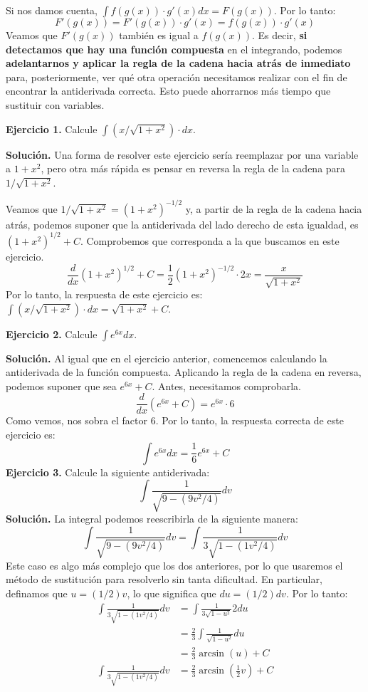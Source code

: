 \documentclass[12pt]{article}
\begin{document}
Si nos damos cuenta, $\int f(g(x)) \cdot g'(x) dx = F(g(x))$. Por lo tanto:
\[
  F'(g(x)) = F'(g(x)) \cdot g'(x) = f(g(x)) \cdot g'(x)
\]
Veamos que $F'(g(x))$ también es igual a $f(g(x))$. Es decir, \textbf{si detectamos que hay una función compuesta} en el integrando, podemos \textbf{adelantarnos y aplicar la regla de la cadena hacia atrás de inmediato} para, posteriormente, ver qué otra operación necesitamos realizar con el fin de encontrar la antiderivada correcta. Esto puede ahorrarnos más tiempo que sustituir con variables.

\textbf{Ejercicio 1.} \quad Calcule $\int (x/\sqrt{1 + x^{2}}) \cdot dx$.

\textbf{Solución.} \quad Una forma de resolver este ejercicio sería reemplazar por una variable a $1 + x^{2}$, pero otra más rápida es pensar en reversa la regla de la cadena para $1/\sqrt{1 + x^{2}}$.

Veamos que $1/\sqrt{1 + x^{2}} = (1 + x^{2})^{-1/2}$ y, a partir de la regla de la cadena hacia atrás, podemos suponer que la antiderivada del lado derecho de esta igualdad, es $(1 + x^{2})^{1/2} + C$. Comprobemos que corresponda a la que buscamos en este ejercicio.
\[
  \frac{d}{dx} (1 + x^{2})^{1/2} + C = \frac{1}{2} (1 + x^{2})^{-1/2} \cdot 2x = \frac{x}{\sqrt{1 + x^{2}}}
\]
Por lo tanto, la respuesta de este ejercicio es: $\int (x/\sqrt{1 + x^{2}}) \cdot dx = \sqrt{1 + x^{2}} + C$.

\textbf{Ejercicio 2.} \quad Calcule $\int e^{6x} dx$.

\textbf{Solución.} \quad Al igual que en el ejercicio anterior, comencemos calculando la antiderivada de la función compuesta. Aplicando la regla de la cadena en reversa, podemos suponer que sea $e^{6x} + C$. Antes, necesitamos comprobarla.
\[
  \frac{d}{dx} (e^{6x} + C) = e^{6x} \cdot 6
\]
Como vemos, nos sobra el factor $6$. Por lo tanto, la respuesta correcta de este ejercicio es:
\[
  \int e^{6x} dx = \frac{1}{6} e^{6x} + C
\]
\textbf{Ejercicio 3.} \quad Calcule la siguiente antiderivada:
\[
  \int \frac{1}{\sqrt{9 - (9v^{2}/4)}} dv
\]
\textbf{Solución.} \quad La integral podemos reescribirla de la siguiente manera:
\[
  \int \frac{1}{\sqrt{9 - (9v^{2}/4)}} dv = \int \frac{1}{3\sqrt{1 - (1v^{2}/4)}} dv
\]
Este caso es algo más complejo que los dos anteriores, por lo que usaremos el método de sustitución para resolverlo sin tanta dificultad. En particular, definamos que $u = (1/2) v$, lo que significa que $du = (1/2) dv$. Por lo tanto:
\begin{align*}
  \int \frac{1}{3\sqrt{1 - (1v^{2}/4)}} dv &= \int \frac{1}{3\sqrt{1 - u^{2}}} 2 du \\
                                           &= \frac{2}{3} \int \frac{1}{\sqrt{1 - u^{2}}} du \\
                                           &= \frac{2}{3} \arcsin(u) + C \\
  \int \frac{1}{3\sqrt{1 - (1v^{2}/4)}} dv &= \frac{2}{3} \arcsin\left(\frac{1}{2} v\right) + C
\end{align*}
\end{document}
